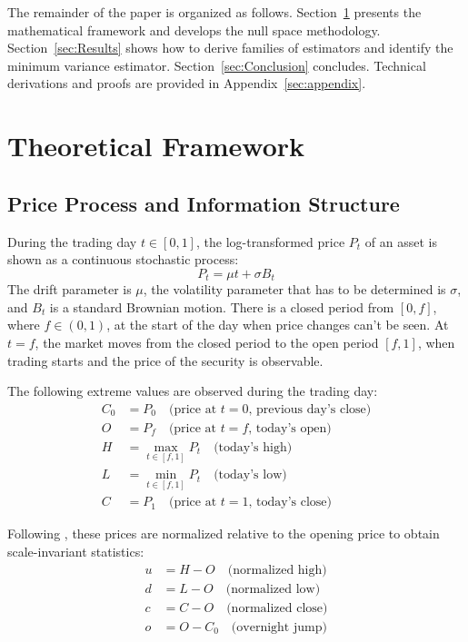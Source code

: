 The remainder of the paper is organized as follows. Section~\ref{sec:Theoretical Framework} presents the mathematical framework and develops the null space methodology. Section~\ref{sec:Results} shows how to derive families of estimators and identify the minimum variance estimator. Section~\ref{sec:Conclusion} concludes. Technical derivations and proofs are provided in Appendix~\ref{sec:appendix}.


\section{Theoretical Framework}
\label{sec:Theoretical Framework}

\subsection{Price Process and Information Structure}

During the trading day $t \in [0,1]$, the log-transformed price $P_t$ of an asset is shown as a continuous stochastic process:
\begin{equation}
P_t = \mu t + \sigma B_t
\end{equation}
The drift parameter is $\mu$, the volatility parameter that has to be determined is $\sigma$, and $B_t$ is a standard Brownian motion. There is a closed period from $[0,f]$, where $f \in (0,1)$, at the start of the day when price changes can't be seen. At $t = f$, the market moves from the closed period to the open period $[f,1]$, when trading starts and the price of the security is observable.

The following extreme values are observed during the trading day:
\begin{align}
C_0 &= P_0 \quad \text{(price at $t=0$, previous day's close)} \\
O &= P_f \quad \text{(price at $t=f$, today's open)} \\
H &= \max_{t \in [f,1]} P_t \quad \text{(today's high)} \\
L &= \min_{t \in [f,1]} P_t \quad \text{(today's low)} \\
C &= P_1 \quad \text{(price at $t=1$, today's close)}
\end{align}

Following \citet{garman1980EstimationSecurityPrice}, these prices are normalized relative to the opening price to obtain scale-invariant statistics:
\begin{align}
u &= H - O \quad \text{(normalized high)} \\
d &= L - O \quad \text{(normalized low)} \\
c &= C - O \quad \text{(normalized close)} \\
o &= O - C_0 \quad \text{(overnight jump)}
\end{align}


